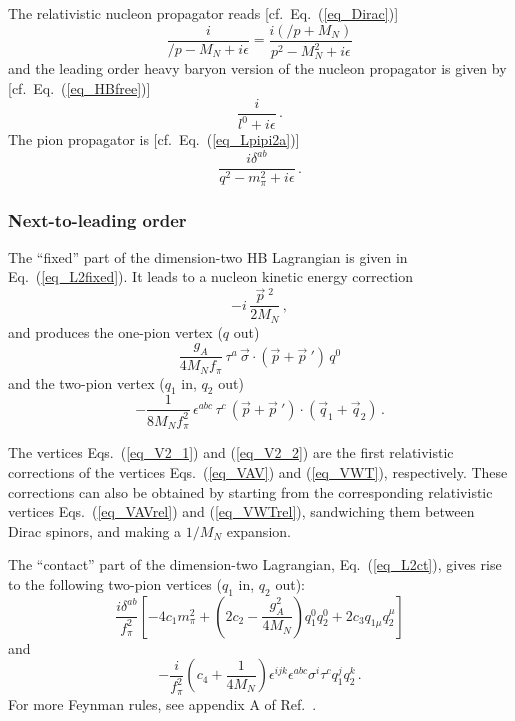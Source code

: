 \documentclass[sort&compress,preprint,3p]{elsarticle}
\begin{document}
%
The relativistic nucleon propagator reads 
[cf.\ Eq.~(\ref{eq_Dirac})]
\begin{equation}
\frac{i}{\slash \! \! \!  p  - M_N + i\epsilon} =
\frac{i(\slash \! \! \!  p  + M_N)}{p^2 - M_N^2 + i\epsilon}
\end{equation}
and the leading order heavy baryon version of the nucleon propagator is
given by [cf.\ Eq.~(\ref{eq_HBfree})]
\begin{equation}
\frac{i}{l^0+i\epsilon} \,.
\end{equation}
The pion propagator is [cf.\ Eq.~(\ref{eq_Lpipi2a})]
\begin{equation}
\frac{i\delta^{ab}}{q^2-m_\pi^2+i\epsilon} \,.
\end{equation}

\subsubsection{Next-to-leading order \label{app_feyn_nlo}}
The ``fixed'' part of the dimension-two HB Lagrangian is given in Eq.~(\ref{eq_L2fixed}).
It leads to a nucleon kinetic energy correction 
\begin{equation}
-i \, \frac{{\vec p}~^2}{2M_N} 
\,,
\label{eq_V2_0}
\end{equation}
and produces the one-pion vertex ($q$ out)
\begin{equation}
\frac{g_A}{4M_Nf_\pi} \, \tau^a \, {\vec \sigma} \cdot (\vec p + {\vec p}~') \, q^0
\label{eq_V2_1}
\end{equation}
and the two-pion vertex ($q_1$ in, $q_2$ out)
\begin{equation}
-\frac{1}{8M_Nf_\pi^2} \, \epsilon^{abc} \, \tau^c \, (\vec p + {\vec p}~') \cdot ({\vec q}_1 + {\vec q}_2)
\,.
\label{eq_V2_2}
\end{equation} 

The vertices Eqs.~(\ref{eq_V2_1}) and (\ref{eq_V2_2}) are the first relativistic corrections
of the vertices Eqs.~(\ref{eq_VAV}) and (\ref{eq_VWT}), respectively. These corrections can also be
obtained by starting from the corresponding relativistic vertices Eqs.~(\ref{eq_VAVrel}) and
(\ref{eq_VWTrel}), sandwiching them between Dirac spinors, and making a $1/M_N$ expansion.

The ``contact'' part of the dimension-two Lagrangian, Eq.~(\ref{eq_L2ct}), gives rise to the following
two-pion vertices ($q_1$ in, $q_2$ out):
\begin{equation}
\frac{i\delta^{ab}}{f_\pi^2} \left[ -4c_1m_\pi^2 + \left(2c_2-\frac{g_A^2}{4M_N} \right)
q_1^0 q_2^0 +2c_3 q_{1\mu} q_2^{\mu} \right]
\label{eq_V2_3}
\end{equation}
and
\begin{equation}
-\frac{i}{f_\pi^2} \left(c_4+\frac{1}{4M_N} \right) \epsilon^{ijk} \epsilon^{abc} \sigma^i \tau^c  q_1^j q_2^k
\,.
\label{eq_V2_4}
\end{equation}
For more Feynman rules, see appendix A of Ref.~\cite{BKM95}.
\end{document}
